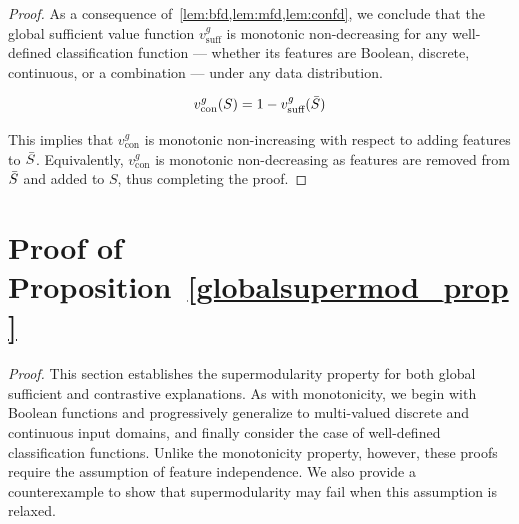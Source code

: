 \documentclass{article}
\begin{document}
\globalmonotonicity*
%
\begin{proof}
As a consequence of~\cref{lem:bfd,lem:mfd,lem:confd}, we conclude that the global sufficient value function $v^g_{\text{suff}}$ is monotonic non-decreasing for any well-defined classification function --- whether its features are Boolean, discrete, continuous, or a combination --- under any data distribution.



\begin{equation}
v^g_{\text{con}}(S) = 1 - v^g_{\text{suff}}(\Bar{S})
\end{equation}

This implies that $v^g_{\text{con}}$ is monotonic non-increasing with respect to adding features to $\Bar{S}$. Equivalently, $v^g_{\text{con}}$ is monotonic non-decreasing as features are removed from $\Bar{S}$ and added to $S$, thus completing the proof.


\end{proof}





\section{Proof of Proposition~\ref{globalsupermod_prop}}
\label{supermodularity_proofs_appendix}

\globalsupermodular*


\emph{Proof.} This section establishes the supermodularity property for both global sufficient and contrastive explanations. As with monotonicity, we begin with Boolean functions and progressively generalize to multi-valued discrete and continuous input domains, and finally consider the case of well-defined classification functions. Unlike the monotonicity property, however, these proofs require the assumption of feature independence. We also provide a counterexample to show that supermodularity may fail when this assumption is relaxed.
\end{document}
